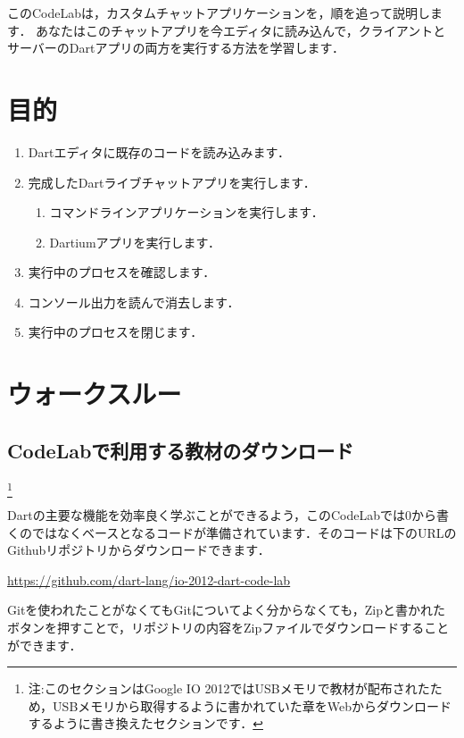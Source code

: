
このCodeLabは，カスタムチャットアプリケーションを，順を追って説明します．
あなたはこのチャットアプリを今エディタに読み込んで，クライアントとサーバーのDartアプリの両方を実行する方法を学習します．

\section{目的}

\begin{enumerate}
\item Dartエディタに既存のコードを読み込みます．
\item 完成したDartライブチャットアプリを実行します．
\begin{enumerate}
\item コマンドラインアプリケーションを実行します．
\item Dartiumアプリを実行します．
\end{enumerate}
\item 実行中のプロセスを確認します．
\item コンソール出力を読んで消去します．
\item 実行中のプロセスを閉じます．
\end{enumerate}

\section{ウォークスルー}

\subsection{CodeLabで利用する教材のダウンロード}\footnote{注:このセクションはGoogle IO 2012ではUSBメモリで教材が配布されたため，USBメモリから取得するように書かれていた章をWebからダウンロードするように書き換えたセクションです．}

Dartの主要な機能を効率良く学ぶことができるよう，このCodeLabでは0から書くのではなくベースとなるコードが準備されています．そのコードは下のURLのGithubリポジトリからダウンロードできます．

\vspace{5mm}
\url{https://github.com/dart-lang/io-2012-dart-code-lab}
\vspace{5mm}

Gitを使われたことがなくてもGitについてよく分からなくても，Zipと書かれたボタンを押すことで，リポジトリの内容をZipファイルでダウンロードすることができます．

